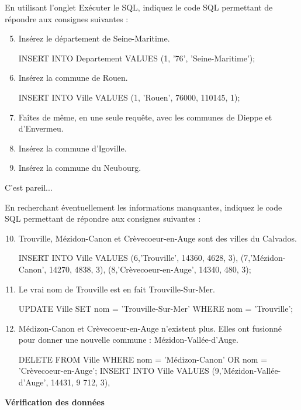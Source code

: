 \documentclass[a4paper,12pt,french]{book}
\begin{document}
En utilisant l’onglet \og Exécuter le SQL\fg{}, indiquez le code SQL permettant de répondre aux consignes suivantes :\\
\begin{enumerate}[\bfseries 1.]
	\setcounter{enumi}{4}
	\item 	Insérez le département de Seine-Maritime.
            \begin{sql}
INSERT INTO Departement VALUES (1, '76', 'Seine-Maritime');
            \end{sql}
	\item 	Insérez la commune de Rouen.
\begin{sql}
INSERT INTO Ville VALUES (1, 'Rouen', 76000, 110145, 1);
\end{sql}
	\item 	Faîtes de même, en une seule requête, avec les communes de Dieppe et d’Envermeu.
	\item 	Insérez la commune d’Igoville.
	\item 	Insérez la commune du Neubourg.	\\
\end{enumerate}
\begin{corrige}
C'est pareil...
\end{corrige}
En recherchant éventuellement les informations manquantes, indiquez le code SQL permettant de répondre aux consignes suivantes :\\
\begin{enumerate}[\bfseries 1.]
		\setcounter{enumi}{9}
	\item 	Trouville, Mézidon-Canon et Crèvecoeur-en-Auge sont des villes du Calvados.
    \begin{sql}
INSERT INTO Ville VALUES 
(6,'Trouville', 14360, 4628, 3),
(7,'Mézidon-Canon', 14270, 4838, 3),
(8,'Crèvecoeur-en-Auge', 14340, 480, 3);    
\end{sql}
	\item 	Le vrai nom de Trouville est en fait Trouville-Sur-Mer.	
\begin{sql}
UPDATE Ville
SET nom = 'Trouville-Sur-Mer'
WHERE nom = 'Trouville';
\end{sql}
	\item 	Médizon-Canon et Crèvecoeur-en-Auge n’existent plus. Elles ont fusionné pour donner une nouvelle commune : Mézidon-Vallée-d’Auge.\\
\begin{sql}
DELETE FROM Ville
WHERE nom = 'Médizon-Canon' OR nom = 'Crèvecoeur-en-Auge';
INSERT INTO Ville VALUES 
(9,'Mézidon-Vallée-d’Auge', 14431, 9 712, 3),

\end{sql}
\end{enumerate}
\textbf{Vérification des données}\\
\end{document}
